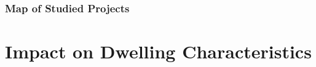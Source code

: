 \documentclass[aspectratio=32]{beamer}
\begin{document}

\begin{frame}
\frametitle{Map of Studied Projects}
\begin{center}
\begin{figure}
\vspace{-3mm}
\end{figure}
\end{center}
\end{frame}




\section{Impact on Dwelling Characteristics}
\end{document}

